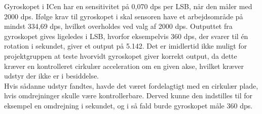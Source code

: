 Gyroskopet i ICen har en sensitivitet på 0,070 dps per LSB, når den måler med 2000 dps. Ifølge krav til gyroskopet i  skal sensoren have et arbejdsområde på mindst 334,69 dps, hvilket overholdes ved valg af 2000 dps. Outputtet fra gyroskopet gives ligeledes i LSB, hvorfor eksempelvis 360 dps, der svarer til én rotation i sekundet, giver et output på 5.142. Det er imidlertid ikke muligt for projektgruppen at teste hvorvidt gyroskopet giver korrekt output, da dette kræver en kontrolleret cirkulær acceleration om en given akse, hvilket kræver udstyr der ikke er i besiddelse.\\
Hvis sådanne udstyr fandtes, havde det været fordelagtigt med en cirkulær plade, hvis omdrejninger skulle være kontrollerbare. Derved kunne den indstilles til for eksempel en omdrejning i sekundet, og i så fald burde gyroskopet måle 360 dps.
%
%
%

